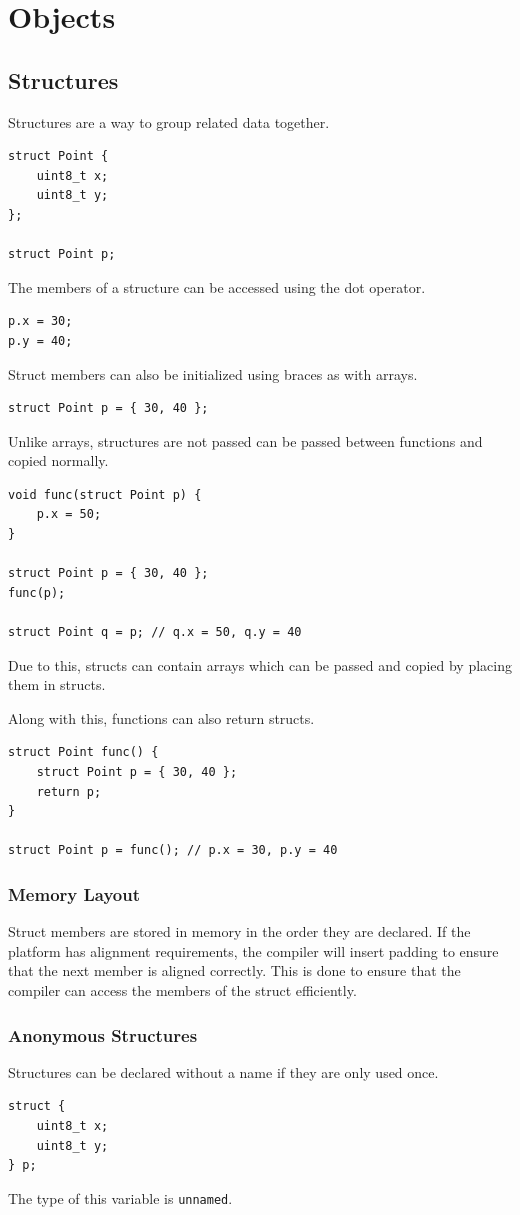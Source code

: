 \documentclass{report}
\begin{document}
\chapter{Objects}
\section{Structures}
Structures are a way to group related data together.
\begin{verbatim}
struct Point {
    uint8_t x;
    uint8_t y;
};

struct Point p;
\end{verbatim}
The members of a structure can be accessed using the dot operator.
\begin{verbatim}
p.x = 30;
p.y = 40;
\end{verbatim}
Struct members can also be initialized using braces as with arrays.
\begin{verbatim}
struct Point p = { 30, 40 };
\end{verbatim}
Unlike arrays, structures are not passed can be passed between functions
and copied normally.
\begin{verbatim}
void func(struct Point p) {
    p.x = 50;
}

struct Point p = { 30, 40 };
func(p);

struct Point q = p; // q.x = 50, q.y = 40
\end{verbatim}
Due to this, structs can contain arrays which can be passed and copied by placing them
in structs.

Along with this, functions can also return structs.
\begin{verbatim}
struct Point func() {
    struct Point p = { 30, 40 };
    return p;
}

struct Point p = func(); // p.x = 30, p.y = 40
\end{verbatim}
\subsection{Memory Layout}
Struct members are stored in memory in the order they are declared.
If the platform has alignment requirements, the compiler will insert padding
to ensure that the next member is aligned correctly. This is done to
ensure that the compiler can access the members of the struct efficiently.
\subsection{Anonymous Structures}
Structures can be declared without a name if they are only used once.
\begin{verbatim}
struct {
    uint8_t x;
    uint8_t y;
} p;
\end{verbatim}
The type of this variable is \texttt{unnamed}.
\end{document}
